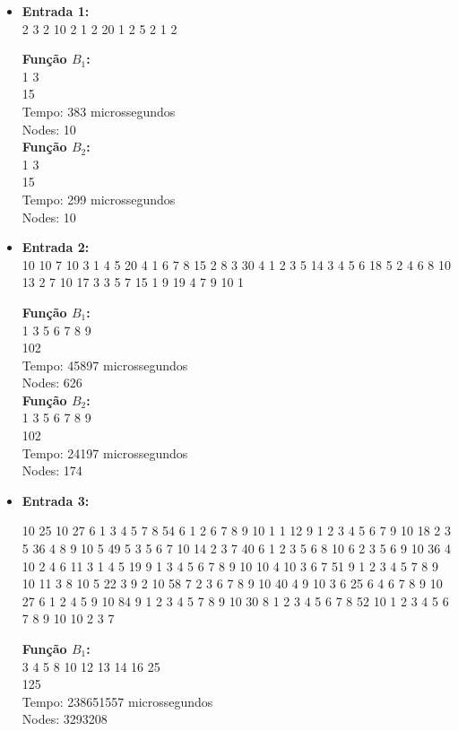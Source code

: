 \documentclass{article}
\begin{document}
\begin{itemize}
    \item \textbf{Entrada 1:} \\
    2 3 2 10 2 1 2 20 1 2 5 2 1 2 

    \textbf{Função $B_1$:} \\
    1 3 \\
    15 \\
    Tempo: 383 microssegundos \\
    Nodes: 10 \\

    \textbf{Função $B_2$:} \\
    1 3 \\
    15 \\
    Tempo: 299 microssegundos \\
    Nodes: 10 \\

    \item \textbf{Entrada 2:} \\
    10 10 7 10 3 1 4 5 20 4 1 6 7 8 15 2 8 3 30 4 1 2 3 5 14 3 4 5 6 18 5 2 4 6 8 10 13 2 7 10 17 3 3 5 7 15 1 9 19 4 7 9 10 1

    \textbf{Função $B_1$:} \\
    1 3 5 6 7 8 9 \\
    102 \\
    Tempo: 45897 microssegundos \\
    Nodes: 626 \\

    \textbf{Função $B_2$:} \\
    1 3 5 6 7 8 9 \\
    102 \\
    Tempo: 24197 microssegundos \\
    Nodes: 174 \\

    \pagebreak
    
    \item \textbf{Entrada 3:} 

    10 25 10 27 6 1 3 4 5 7 8 54 6 1 2 6 7 8 9 10 1 1 12 9 1 2 3 4 5 6 7 9 10 18 2 3 5 36 4 8 9 10 5 49 5 3 5 6 7 10 14 2 3 7 40 6 1 2 3 5 6 8 10 6 2 3 5 6 9 10 36 4 10 2 4 6 11 3 1 4 5 19 9 1 3 4 5 6 7 8 9 10 10 4 10 3 6 7 51 9 1 2 3 4 5 7 8 9 10 11 3 8 10 5 22 3 9 2 10 58 7 2 3 6 7 8 9 10 40 4 9 10 3 6 25 6 4 6 7 8 9 10 27 6 1 2 4 5 9 10 84 9 1 2 3 4 5 7 8 9 10 30 8 1 2 3 4 5 6 7 8 52 10 1 2 3 4 5 6 7 8 9 10 10 2 3 7

    \textbf{Função $B_1$:} \\
    3 4 5 8 10 12 13 14 16 25 \\
    125 \\
    Tempo: 238651557 microssegundos \\
    Nodes: 3293208 \\


\end{itemize}
\end{document}
